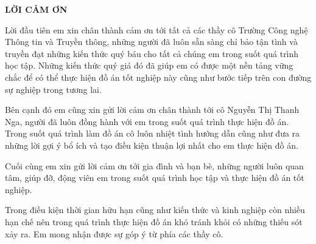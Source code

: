 \documentclass[../DoAn.tex]{subfiles}
\begin{document}
\begin{center}
    \Large{\textbf{LỜI CẢM ƠN}}\\
\end{center}
\vspace{1cm}

Lời đầu tiên em xin chân thành cảm ơn tới tất cả các thầy cô Trường Công nghệ Thông tin và Truyền thông, những người đã luôn sẵn sàng chỉ bảo tận tình và truyền đạt những kiến thức quý báu cho tất cả chúng em trong suốt quá trình học tập. Những kiến thức quý giá đó đã giúp em có được một nền tảng vững chắc để có thể thực hiện đồ án tốt nghiệp này cũng như bước tiếp trên con đường sự nghiệp trong tương lai.

Bên cạnh đó em cũng xin gửi lời cảm ơn chân thành tới cô Nguyễn Thị Thanh Nga, người đã luôn đồng hành với em trong suốt quá trình thực hiện đồ án. Trong suốt quá trình làm đồ án cô luôn nhiệt tình hướng dẫn cũng như đưa ra những lời gợi ý bổ ích và tạo điều kiện thuận lợi nhất cho em thực hiện đồ án.

Cuối cùng em xin gửi lời cảm ơn tới gia đình và bạn bè, những người luôn quan tâm, giúp đỡ, động viên em trong suốt quá trình học tập và thực hiện đồ án tốt nghiệp.

Trong điều kiện thời gian hữu hạn cũng như kiến thức và kinh nghiệp còn nhiều hạn chế nên trong quá trình thực hiện đồ án khó tránh khỏi có những thiếu sót xảy ra. Em mong nhận được sự góp ý từ phía các thầy cô.
\end{document}
